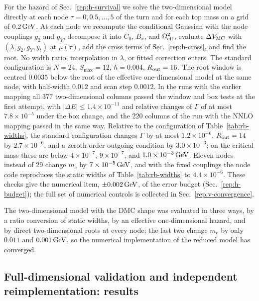 For the hazard of Sec.~\ref{rep:h-survival} we solve the two-dimensional model directly at each node $\tau=0,0.5,\ldots,5$ of the turn and for each top mass on a grid of $0.2\,\mathrm{GeV}$. %
At each node we recompute the conditional Gaussian with the node couplings $g_2$ and $g_Y$, decompose it into $C_0$, $B_x$, and $\Omega_{\rm eff}^2$, evaluate $\Delta V_{\rm MC}$ with $(\lambda,g_2,g_Y,y_t)$ at $\mu(\tau)$, add the cross terms of Sec.~\ref{rep:h-cross}, and find the root.
No width ratio, interpolation in $\lambda$, or fitted correction enters.
The standard configuration is $N=24$, $S_{\max}=12$, $h=0.004$, $R_{\rm out}=16$. %
The root window is centred $0.0035$ below the root of the effective one-dimensional model at the same node, with half-width $0.012$ and scan step $0.0012$. %
In the runs with the earlier mapping all 377 two-dimensional columns passed the window and box tests at the first attempt, with $|\Delta E|\le1.4\times10^{-11}$ and relative changes of $\Gamma$ of at most $7.8\times10^{-5}$ under the box change, and the 220 columns of the run with the NNLO mapping passed in the same way. %
Relative to the configuration of Table~\ref{tab:rb-widths}, the standard configuration changes $\Gamma$ by at most $1.2\times10^{-6}$, $R_{\rm out}=14$ by $2.7\times10^{-6}$, and a zeroth-order outgoing condition by $3.0\times10^{-3}$; on the critical mass these are below $4\times10^{-7}$, $9\times10^{-7}$, and $1.0\times10^{-3}\,\mathrm{GeV}$. %
Eleven nodes instead of 29 change $m_c$ by $7\times10^{-5}\,\mathrm{GeV}$, and with the fixed couplings the node code reproduces the static widths of Table~\ref{tab:rb-widths} to $4.4\times10^{-6}$. %
These checks give the numerical item, $\pm0.002\,\mathrm{GeV}$, of the error budget (Sec.~\ref{rep:h-budget}); the full set of numerical controls is collected in Sec.~\ref{rep:v-convergence}. %

The two-dimensional model with the DMC shape was evaluated in three ways, by a ratio conversion of static widths, by an effective one-dimensional hazard, and by direct two-dimensional roots at every node; the last two change $m_c$ by only $0.011$ and $0.001\,\mathrm{GeV}$, so the numerical implementation of the reduced model has converged. %

\subsection{Full-dimensional validation and independent reimplementation: results}
\label{sec:rb-fulldim}

